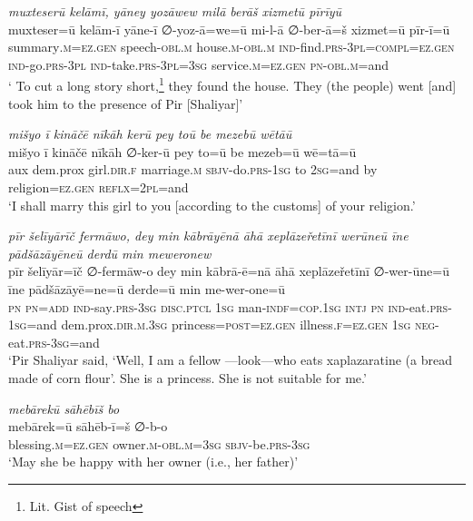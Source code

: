 \ea \label{ŽP.205}
\textit{muxteserū kelāmī, yāney yozāwew milā berāš xizmetū pīrīyū} \\ 
\gll muxteser=ū kelām-ī yāne-ī ∅-yoz-ā=we=ū mi-l-ā ∅-ber-ā=š xizmet=ū pīr-ī=ū \\ 
 summary\textsc{.m}\textsc{\textsc{=ez.gen}} speech\textsc{-obl}\textsc{.m} house\textsc{.m}\textsc{-obl}\textsc{.m} \textsc{ind-}find\textsc{.prs}\textsc{-3pl}\textsc{=compl}\textsc{\textsc{=ez.gen}} \textsc{ind-}go\textsc{.prs}\textsc{-3pl} \textsc{ind-}take\textsc{.prs}\textsc{-3pl}\textsc{=3sg} service\textsc{.m}\textsc{\textsc{=ez.gen}} \textsc{pn}\textsc{-obl}\textsc{.m}=and \\ 
\glt ` To cut a long story short,\footnote{Lit. Gist of speech} they found the house. They (the people) went [and] took him to the presence of Pir [Shaliyar]'
\z 
 
\ea \label{ŽP.207}
\textit{mišyo ī kināčē nīkāh kerū pey toū be mezebū wētāū} \\ 
\gll mišyo ī kināčē nīkāh ∅-ker-ū pey to=ū be mezeb=ū wē=tā=ū \\ 
 aux dem.prox girl\textsc{.dir}\textsc{.f} marriage\textsc{.m} \textsc{sbjv-}do\textsc{.prs}\textsc{-\textsc{1sg}} to \textsc{2sg}=and by religion\textsc{\textsc{=ez.gen}} \textsc{reflx}=\textsc{2pl}=and \\ 
\glt `I shall marry this girl to you [according to the customs] of your religion.'
\z 
 
\ea \label{ŽP.210}
\textit{pīr šelīyārīč fermāwo, dey min kābrāyēnā āhā xeplāzeřetīnī werūneū īne pādšāzāyēneū derdū min meweronew} \\ 
\gll pīr šelīyār=īč ∅-fermāw-o dey min kābrā-ē=nā āhā xeplāzeřetīnī ∅-wer-ūne=ū īne pādšāzāyē=ne=ū derde=ū min me-wer-one=ū \\ 
 \textsc{pn} \textsc{pn}\textsc{=add} \textsc{ind-}say\textsc{.prs}\textsc{-3sg} \textsc{disc.ptcl} \textsc{1sg} man\textsc{-indf}\textsc{=cop}\textsc{.\textsc{1sg}} \textsc{intj} \textsc{pn} \textsc{ind-}eat\textsc{.prs}\textsc{-\textsc{1sg}}=and dem.prox\textsc{.dir}\textsc{.m}\textsc{.3sg} princess\textsc{=\textsc{post}}\textsc{\textsc{=ez.gen}} illness\textsc{.f}\textsc{\textsc{=ez.gen}} \textsc{1sg} \textsc{neg-}eat\textsc{.prs}\textsc{-3sg}=and \\ 
\glt `Pir Shaliyar said, ‘Well, I am a fellow —look—who eats xaplazaratine (a bread made of corn flour’. She is a princess. She is not suitable for me.'
\z 
 
\ea \label{ŽP.211}
\textit{mebārekū sāhēbīš bo} \\ 
\gll mebārek=ū sāhēb-ī=š ∅-b-o \\ 
 blessing\textsc{.m}\textsc{\textsc{=ez.gen}} owner\textsc{.m}\textsc{-obl}\textsc{.m}\textsc{=3sg} \textsc{sbjv-}be\textsc{.prs}\textsc{-3sg} \\ 
\glt `May she be happy with her owner (i.e., her father)'
\z 
 
